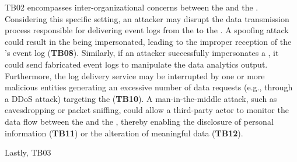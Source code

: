 \begin{newj}
TB02  encompasses inter-organizational concerns between the  and the . Considering this specific setting, an attacker may disrupt the data transmission process responsible for delivering event logs from the  to the . A spoofing attack could result in the  being impersonated, leading to the improper reception of the 's event log (\textbf{TB08}). Similarly, if an attacker successfully impersonates a , it could send fabricated event logs to manipulate the data analytics output. Furthermore, the log delivery service may be interrupted by one or more malicious entities generating an excessive number of data requests (e.g., through a DDoS attack) targeting the  (\textbf{TB10}). A man-in-the-middle attack, such as eavesdropping or packet sniffing, could allow a third-party actor to monitor the data flow between the  and the , thereby enabling the disclosure of personal information (\textbf{TB11}) or the alteration of meaningful data (\textbf{TB12}).

Lastly, TB03
\end{newj}


